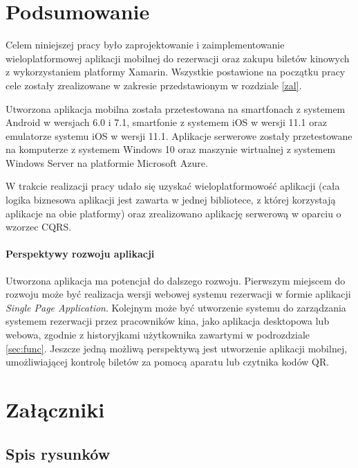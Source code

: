 \chapter{Podsumowanie}
Celem niniejszej pracy było zaprojektowanie i zaimplementowanie wieloplatformowej aplikacji mobilnej do rezerwacji oraz zakupu biletów kinowych z wykorzystaniem platformy Xamarin. Wszystkie postawione na początku pracy cele zostały zrealizowane w zakresie przedstawionym w rozdziale \ref{zal}.

Utworzona aplikacja mobilna została przetestowana na smartfonach z systemem Android w wersjach 6.0 i 7.1, smartfonie z systemem iOS w wersji 11.1 oraz emulatorze systemu iOS w wersji 11.1. Aplikacje serwerowe zostały przetestowane na komputerze z systemem Windows 10 oraz maszynie wirtualnej z systemem Windows Server na platformie Microsoft Azure.

W trakcie realizacji pracy udało się uzyskać wieloplatformowość aplikacji (cała logika biznesowa aplikacji jest zawarta w jednej bibliotece, z której korzystają aplikacje na obie platformy) oraz zrealizowano aplikację serwerową w oparciu o wzorzec CQRS.

\subsubsection*{Perspektywy rozwoju aplikacji}
Utworzona aplikacja ma potencjał do dalszego rozwoju. Pierwszym miejscem do rozwoju może być realizacja wersji webowej systemu rezerwacji w formie aplikacji \textit{Single Page Application}. Kolejnym może być utworzenie systemu do zarządzania systemem rezerwacji przez pracowników kina, jako aplikacja desktopowa lub webowa, zgodnie z historyjkami użytkownika zawartymi w podrozdziale \ref{sec:func}. Jeszcze jedną możliwą perspektywą jest utworzenie aplikacji mobilnej, umożliwiającej kontrolę biletów za pomocą aparatu lub czytnika kodów QR.
\printbibliography[nottype=misc, title={Bibliografia},resetnumbers=true,heading=bibintoc]
\begin{refcontext}[labelprefix=L]
\printbibliography[type=misc, title={Netografia},resetnumbers=true,heading=bibintoc]
\end{refcontext}
\chapter*{Załączniki}

\section*{Spis rysunków}
\listoffigures
\lstlistoflistings
{}
